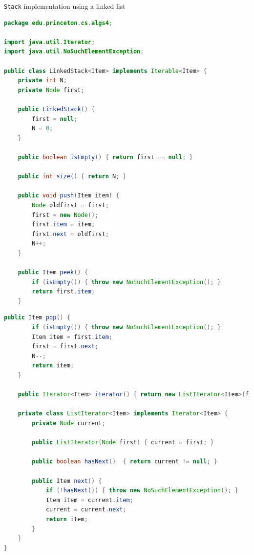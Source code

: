 \documentclass[8pt,a4paper,compress]{beamer}
\begin{document}
\begin{frame}[fragile]
\pause

\lstinline{Stack} implementation using a linked list
\begin{lstlisting}[language=Java]
package edu.princeton.cs.algs4;

import java.util.Iterator;
import java.util.NoSuchElementException;

public class LinkedStack<Item> implements Iterable<Item> {
    private int N; 
    private Node first; 
    
    public LinkedStack() {
        first = null; 
        N = 0;
    }

    public boolean isEmpty() { return first == null; }

    public int size() { return N; }

    public void push(Item item) {
        Node oldfirst = first;
        first = new Node(); 
        first.item = item;
        first.next = oldfirst;
        N++;
    }

    public Item peek() {
        if (isEmpty()) { throw new NoSuchElementException(); }
        return first.item;
    }
\end{lstlisting}
\end{frame}

\begin{frame}[fragile]
\pause

\begin{lstlisting}[language=Java]
    public Item pop() {
        if (isEmpty()) { throw new NoSuchElementException(); }
        Item item = first.item; 
        first = first.next; 
        N--;
        return item; 
    }

    public Iterator<Item> iterator() { return new ListIterator<Item>(first); }

    private class ListIterator<Item> implements Iterator<Item> {
        private Node current;

        public ListIterator(Node first) { current = first; }

        public boolean hasNext()  { return current != null; }

        public Item next() {
            if (!hasNext()) { throw new NoSuchElementException(); }
            Item item = current.item;
            current = current.next; 
            return item;
        }
    }
}
\end{lstlisting}
\end{frame}
\end{document}

